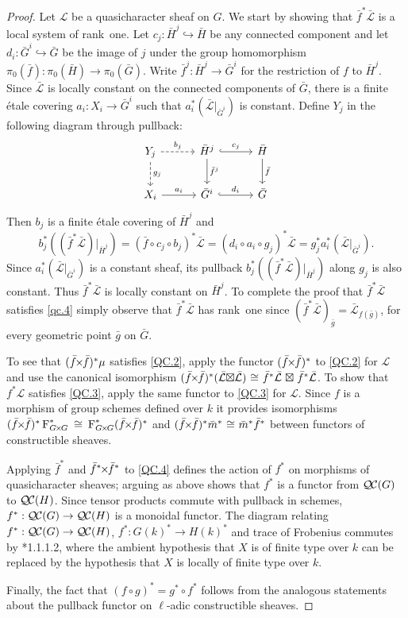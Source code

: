 \documentclass{amsart}
\theoremstyle{plain}
\theoremstyle{definition}
\theoremstyle{remark}
\newcommand{\Fq}{k}
\newcommand{\Frob}[1]{\operatorname{F}_{#1}}
\newcommand{\iso}{{\ \cong\ }}
\newcommand{\qcs}[1]{{\mathcal{#1}}}
\newcommand{\gqcs}[1]{{\mathcal{\bar #1}}}
\newcommand{\QC}{{\mathcal{Q\hskip-0.8pt C}}}
\renewcommand{\bf}{\bar{f}}
\newcommand{\bg}{\bar{g}}
\newcommand{\bm}{\bar{m}}
\newcommand{\bG}{\bar{G}}
\newcommand{\bH}{\bar{H}}
\newcommand{\tight}[3]{\hspace{-#1pt}{#2}\hspace{-#3pt}}
\newcommand{\bfxf}{\text{$\bar{f} \tight{1}{\times}{1} \bar{f}$}}
\newcommand{\GxxG}{\text{$G \tight{1}{\times}{1} G$}}
\newcommand{\LxL}{\text{$\gqcs{L} \tight{0}{\boxtimes}{0} \gqcs{L}$}}
\begin{document}
\begin{proof}
  Let $\qcs{L}$ be a quasicharacter sheaf on $G$. We start by showing that
  $\bf^*\gqcs{L}$ is a local system of rank~one. Let $c_j :\bH^j \hookrightarrow \bH$ be any
  connected component and let $d_i : \bG^i \hookrightarrow \bG$ be the image of $j$ under the group
  homomorphism $\pi_0(\bf) : \pi_0(\bH) \to \pi_0(\bG)$.  Write $\bf^j : \bH^j \to \bG^i$
  for the restriction of $f$ to $\bH^j$.  Since $\gqcs{L}$ is locally constant on the connected
  components of $\bG$, there is a finite \'etale covering
  $a_i : X_i \to \bG^i$ such that $a_i^* (\gqcs{L}\vert_{\bG^i})$
  is constant.  Define $Y_j$ in the following diagram through pullback:
  \[
  \begin{tikzcd}[row sep=20, column sep=30]
   Y_j \dar[dashed]{g_j} \rar[dashed]{b_j} & \bH^j \dar{\bf^j} \rar[hook]{c_j} & \bH \dar{\bf} \\
   X_i \rar{a_i} & \bG^i \rar[hook]{d_i} & \bG
  \end{tikzcd}
  \]
  Then $b_j$ is a finite \'etale covering
  of $\bH^j$ and
  \[
  b_j^* \left( (\bf^* \gqcs{L})\vert_{\bH^j}\right)
  = (\bf\circ c_j \circ b_j)^*\gqcs{L}
  = (d_i\circ a_i\circ g_j)^*\gqcs{L} = g_j^* a_i^* (\gqcs{L}\vert_{\bG^i}).
  \]
  Since $a_i^* (\gqcs{L}\vert_{\bG^i})$ is a constant sheaf, its pullback
  $b_j^* \left( (\bf^*\gqcs{L})\vert_{\bH^j}\right)$ along $g_j$ is also constant.
  Thus $\bf^*\gqcs{L}$ is locally constant on
  $\bH^j$. To complete the proof that $\bf^*\gqcs{L}$ satisfies 
  \ref{qc.4}
  simply observe that $\bf^*\gqcs{L}$ has rank~one since 
  $(\bf^*\gqcs{L})_{\bg} = \gqcs{L}_{f(\bg)}$, for every geometric point ${\bg}$ on $\bG$.
  

  To see that $(\bfxf)^* \mu$ satisfies \ref{QC.2}, 
  apply the functor $(\bfxf)^*$
  to \ref{QC.2} for $\qcs{L}$ and use the canonical isomorphism
  $(\bfxf)^*(\LxL) \iso \bf^*\gqcs{L} \tight{-3}{\boxtimes}{-3} \bf^*\gqcs{L}$.
  To show that $f^*\qcs{L}$ satisfies 
  \ref{QC.3}, apply the same functor to \ref{QC.3} for $\qcs{L}$.
  Since $f$ is a morphism of group schemes defined over $\Fq$
  it provides isomorphisms $(\bfxf)^*\Frob{\GxxG}^* \iso \Frob{\GxxG}^* (\bfxf)^*$
  and $(\bfxf)^* \bm^*\iso \bm^* \bf^*$ between functors of constructible sheaves.
  
  Applying $\bf^*$ and $\bf^* \tight{1}{\times}{1}\bf^*$ to \ref{QC.4} defines the action
  of $f^*$ on morphisms of quasicharacter sheaves; arguing as above shows that $f^*$ is
  a functor from $\QC(G)$ to $\QC(H)$.  Since tensor products commute with pullback in schemes,
  $f^* : \QC(G) \to \QC(H)$ is a monoidal functor.
  The diagram relating $f^* : \QC(G) \to \QC(H)$, $f^* : G(k)^* \to H(k)^*$ and trace of Frobenius
  commutes by \cite{laumon:87a}*{1.1.1.2}, where the ambient
  hypothesis that $X$ is of finite type over $\Fq$ can be replaced by
  the hypothesis that $X$ is locally of finite type over $\Fq$.
  
  Finally, the fact that $(f\circ g)^* = g^* \circ f^*$ follows from the analogous
  statements about the pullback functor on $\ell$-adic constructible sheaves.
\end{proof}
\end{document}
